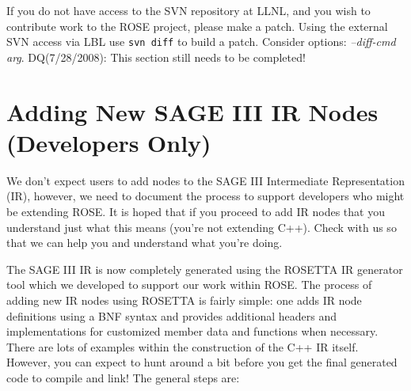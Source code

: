 If you do not have access to the SVN repository at LLNL, and you wish to contribute
work to the ROSE project, please make a patch.  Using the external SVN access via
LBL use {\tt svn diff} to build a patch.
Consider options: {\em --diff-cmd arg}.
DQ(7/28/2008): This section still needs to be completed!



\section {Adding New SAGE III IR Nodes (Developers Only)}
    We don't expect users to add nodes to the SAGE III Intermediate Representation (IR),
however, we need to document the process to support developers who might be extending
ROSE.  It is hoped that if you proceed to add IR nodes that you understand just
what this means (you're not extending C++). Check with us so that we can help you and
understand what you're doing.

The SAGE III IR is now completely generated using the ROSETTA IR generator tool which we developed to support our work within ROSE.
   The process of adding new IR nodes using ROSETTA is fairly simple: one
   adds IR node definitions using a BNF syntax and provides additional
   headers and implementations for customized member data and functions
   when necessary. 
  There are lots of examples within the construction of the C++ IR itself.
However, you can expect to hunt around a bit before you get the final generated code to
compile and link!  The general steps are:

